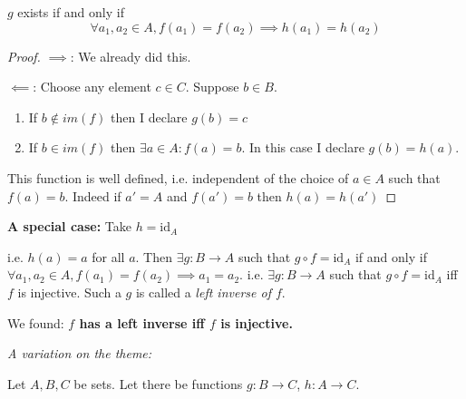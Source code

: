 \documentclass[10pt]{scrartcl}
\begin{document}
\begin{theorem}
$g$ exists if and only if 
\[\forall a_1,a_2 \in A, f(a_1) = f(a_2) \implies h(a_1) = h(a_2)\]	
\end{theorem}
\begin{proof}
$\implies$: We already did this. 

$\impliedby$: Choose any element $c \in C$. Suppose $b \in B$.
\begin{enumerate}
\item If $b \not\in im(f)$ then I declare $g(b) = c$	
\item If $b \in im(f)$ then $\exists a \in A: f(a) = b$. In this case I declare $g(b) = h(a)$. 
\end{enumerate}
This function is well defined, i.e. independent of the choice of $a \in A$ such that $f(a) = b$. Indeed if $a' = A$ and $f(a') = b$ then $h(a) = h(a')$
\end{proof}

\textbf{A special case:} Take $h = \text{id}_A$
\begin{center}
\end{center}

i.e. $h(a) = a$ for all $a$. Then $\exists g : B\to A$ such that $g \circ f = \text{id}_A$ if and only if $\forall a_1,a_2 \in A, f(a_1) = f(a_2) \implies a_1 = a_2$. i.e. $\exists g: B\to A$ such that $g \circ f = \text{id}_A$ iff $f$ is injective. Such a $g$ is called a \emph{left inverse of $f$}.\vspace*{5pt}

We found: \textbf{$f$ has a left inverse iff $f$ is injective.}\vspace*{10pt}

\emph{A variation on the theme:}

Let $A, B, C$ be sets. Let there be functions $g: B \to C$, $h: A \to C$. 

\begin{center}
\end{center}
\end{document}
